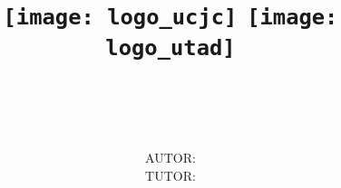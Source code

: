 \begin{titlepage}

    \title{
        \vspace{-1cm}
        \begin{figure}[H]
            \texttt{[image: logo\_ucjc]}\hfill%
            \texttt{[image: logo\_utad]}%
            \vspace{1cm}
        \end{figure}
        \vspace{4cm}
        \large \MakeUppercase{\utadcourse} \\
        \vspace{0.5cm}
        \Huge \MakeUppercase{\utadtitle}
        \vfill
    }
    \author{
        AUTOR: \MakeUppercase{\utadstudent} \\
        TUTOR: \MakeUppercase{\utadtutor}
    }
    \date{}
    \maketitle
\end{titlepage}